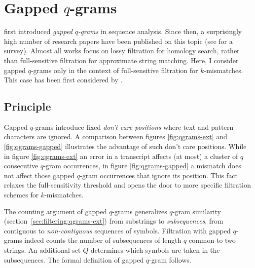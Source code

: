 
\section{Gapped $q$-grams}
\label{sec:filtering:qgrams-gapped}

\cite{Califano1993} first introduced \emph{gapped $q$-grams} in sequence analysis.
Since then, a surprisingly high number of research papers have been published on this topic (see \citep{Brown2008} for a survey).
Almost all works focus on lossy filtration for homology search, rather than full-sensitive filtration for approximate string matching.
Here, I consider gapped $q$-grams only in the context of full-sensitive filtration for $k$-mis\-matches.
This case has been first considered by \cite{Burkhardt2001}.

\subsection{Principle}

Gapped $q$-grams introduce fixed \emph{don't care positions} where text and pattern characters are ignored.
A comparison between figures \ref{fig:qgrams-ext} and \ref{fig:qgrams-gapped} illustrates the advantage of such don't care positions.
While in figure \ref{fig:qgrams-ext} an error in a transcript affects (at most) a cluster of $q$ consecutive $q$-gram occurrences, in figure \ref{fig:qgrams-gapped} a mismatch does not affect those gapped $q$-gram occurrences that ignore its position.
This fact relaxes the full-sensitivity threshold and opens the door to more specific filtration schemes for $k$-mismatches.

The counting argument of gapped $q$-grams generalizes $q$-gram similarity (section~\ref{sec:filtering:qgrams-ext}) from substrings to \emph{subsequences}, \ie from contiguous to \emph{non-contiguous} sequences of symbols.
Filtration with gapped $q$-grams indeed counts the number of subsequences of length $q$ common to two strings.
An additional set $Q$ determines which symbols are taken in the subsequences.
The formal definition of gapped $q$-gram follows.

